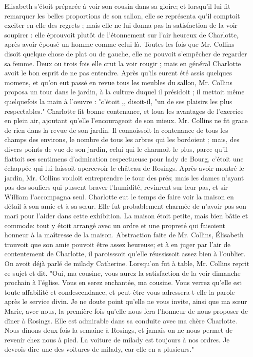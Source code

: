 Elisabeth s'étoit préparée à voir son cousin dans sa gloire; et lorsqu'il lui fit remarquer les belles proportions de son sallon, elle se représenta qu'il comptoit exciter en\setcounter{page}{524} elle des regrets ; mais elle ne lui donna pas la satisfaction de la voir soupirer : elle éprouvoit plutôt de l'étonnement sur l'air heureux de Charlotte, après avoir épousé un homme comme celui-là. Toutes les fois que Mr. Collins disoit quelque chose de plat ou de gauche, elle ne pouvoit s'empêcher de regarder sa femme. Deux ou trois fois elle crut la voir rougir ; mais en général Charlotte avoit le bon esprit de ne pas entendre. Après qu'ils eurent été assis quelques momens, et qu'on eut passé en revue tous les meubles du sallon, Mr. Collins proposa un tour dans le jardin, à la culture duquel il présidoit ; il mettoit même quelquefois la main à l'œuvre : "c'étoit ,, disoit-il, "un de ses plaisirs les plus respectables." Charlotte fit bonne contenance, et loua les avantages de l'exercice en plein air, ajoutant qu'elle l'encourageoit de son mieux. Mr. Collins ne fit grace de rien dans la revue de son jardin. Il connoissoit la contenance de tous les champs des environs, le nombre de tous les arbres qui les bordoient ; mais, des divers points de vue de son jardin, celui qui le charmoit le plus, parce qu'il flattoit ses sentimens d'admiration respectueuse pour lady de Bourg, c'étoit une échappée qui lui laissoit apercevoir le château de Rosings.
\setcounter{page}{525}
Après avoir montré le jardin, Mr. Collins vouloit entreprendre le tour des prés; mais les dames n'ayant pas des souliers qui pussent braver l'humidité, revinrent sur leur pas, et sir William l'accompagna seul. Charlotte eut le temps de faire voir la maison en détail à son amie et à sa sœur. Elle fut probablement charmée de n'avoir pas son mari pour l'aider dans cette exhibition. La maison étoit petite, mais bien bâtie et commode: tout y étoit arrangé avec un ordre et une propreté qui faisoient honneur à la maîtresse de la maison. Abstraction faite de Mr. Collins, Élisabeth trouvoit que son amie pouvoit être assez heureuse; et à en juger par l'air de contentement de Charlotte, il paroisssoit qu'elle réussissoit assez bien à l'oublier.
On avoit déjà parlé de milady Catherine. Lorsqu'on fut à table, Mr. Collins reprit ce sujet et dit. "Oui, ma cousine, vous aurez la satisfaction de la voir dimanche prochain à l'église. Vous en serez enchantée, ma cousine. Vous verrez qu'elle est toute affabilité et condescendance, et peut-être vous adressera-t-elle la parole après le service divin. Je ne doute point qu'elle ne vous invite, ainsi que ma sœur Marie, avec nous, la première\setcounter{page}{526} fois qu'elle nous fera l'honneur de nous proposer de dîner à Rosings. Elle est admirable dans sa conduite avec ma chère Charlotte. Nous dînons deux fois la semaine à Rosings, et jamais on ne nous permet de revenir chez nous à pied. La voiture de milady est toujours à nos ordres. Je devrois dire une des voitures de milady, car elle en a plusieurs."
